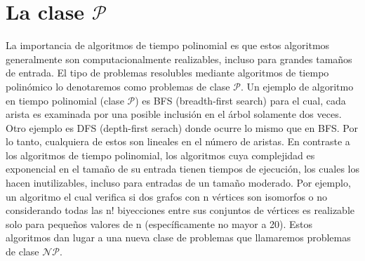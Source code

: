 \documentclass{article}
\begin{document}
\section*{La clase \textit{\textbf{$\mathcal{P}$}}}
La importancia de algoritmos de tiempo polinomial es que estos algoritmos
generalmente son computacionalmente realizables, incluso para grandes
tamaños de entrada. \newline
\indent El tipo de problemas resolubles mediante algoritmos de tiempo polinómico
lo denotaremos como problemas de clase $\mathcal{P}$.\newline
\indent Un ejemplo de algoritmo en tiempo polinomial (clase \textit{$\mathcal{P}$})
es BFS (breadth-first search) para el cual, cada arista es examinada por una posible
inclusión en el árbol solamente dos veces. Otro ejemplo es DFS (depth-first serach)
donde ocurre lo mismo que en BFS. Por lo tanto, cualquiera de estos son
lineales en el número de aristas. \newline
\indent En contraste a los algoritmos de tiempo polinomial, los
algoritmos cuya complejidad es exponencial en el tamaño de su
entrada tienen tiempos de ejecución, los cuales los hacen inutilizables,
incluso para entradas de un tamaño moderado. Por ejemplo, un algoritmo
el cual verifica si dos grafos con n vértices son isomorfos o no 
considerando todas las n! biyecciones entre sus conjuntos de vértices es
realizable solo para pequeños valores de n (específicamente no mayor a 20).\newline
\indent Estos algoritmos dan lugar a una nueva clase de problemas que llamaremos
problemas de clase \textit{$\mathcal{N}\mathcal{P}$}.\newline

\indent
\end{document}

